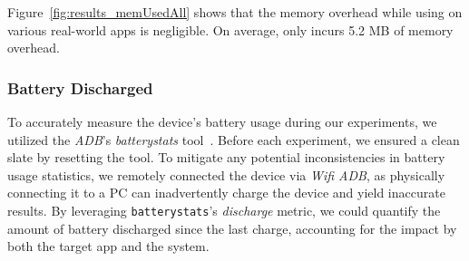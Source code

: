 Figure~\ref{fig:results_memUsedAll} shows that the memory overhead while using
\framework{} on various real-world apps is negligible.  On average, \framework
only incurs 5.2 MB of memory overhead. 


\subsubsection*{\textbf{Battery Discharged}} 
To accurately measure the device's battery usage during our experiments, we
utilized the \textit{ADB}'s \textit{batterystats} tool~\cite{batterystats}.
Before each experiment, we ensured a clean slate by resetting the tool. To
mitigate any potential inconsistencies in battery usage statistics, we remotely
connected the device via \textit{Wifi ADB}, as physically connecting it to a PC
can inadvertently charge the device and yield inaccurate results. 
By leveraging \texttt{batterystats}'s \textit{discharge} metric, we could
quantify the amount of battery discharged since the last charge, accounting for
the impact by both the target app and the system. 

